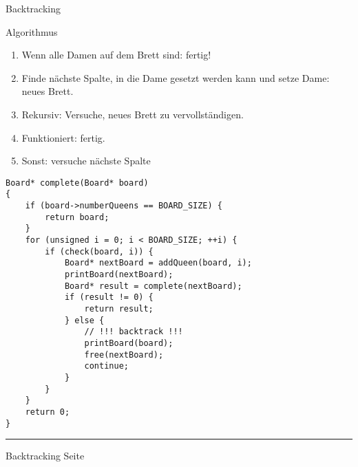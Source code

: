 \begin{slide}{}
\normalsize

\begin{center}
Backtracking
\end{center}
\vspace*{0.5cm}

\footnotesize
Algorithmus
\begin{enumerate}
\item Wenn alle Damen auf dem Brett sind: fertig!
\item Finde n\"achste Spalte, in die Dame gesetzt werden kann
      und setze Dame: neues Brett.
\item Rekursiv: Versuche, neues Brett zu vervollst\"andigen.
\item Funktioniert: fertig.
\item Sonst: versuche n\"achste Spalte
\end{enumerate}

\begin{verbatim}
Board* complete(Board* board)
{
    if (board->numberQueens == BOARD_SIZE) {
        return board;
    }
    for (unsigned i = 0; i < BOARD_SIZE; ++i) {
        if (check(board, i)) {
            Board* nextBoard = addQueen(board, i);
            printBoard(nextBoard);
            Board* result = complete(nextBoard);
            if (result != 0) {
                return result;
            } else {
                // !!! backtrack !!!
                printBoard(board);
                free(nextBoard);
                continue;
            }
        }
    }
    return 0;
}
\end{verbatim}

\vspace*{\fill}
\tiny \addtocounter{mypage}{1}
\rule{17cm}{1mm}
Backtracking  \hspace*{\fill} Seite 
\end{slide}


